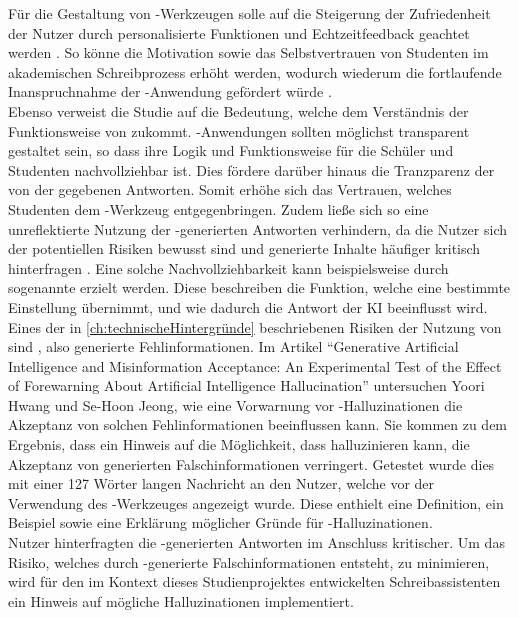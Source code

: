 \documentclass[../main.tex]{subfiles}
\begin{document}
Für die Gestaltung von -Werkzeugen solle auf die Steigerung der Zufriedenheit der Nutzer durch personalisierte Funktionen und Echtzeitfeedback geachtet 
werden \cite[10]{influencingUsingAi}. So könne die Motivation sowie das Selbstvertrauen von Studenten im akademischen Schreibprozess erhöht werden, wodurch 
wiederum die fortlaufende Inanspruchnahme der -Anwendung gefördert würde \cite[10]{influencingUsingAi}. \\Ebenso verweist die Studie auf die Bedeutung, welche dem 
Verständnis der Funktionsweise von  zukommt. -Anwendungen sollten möglichst transparent gestaltet sein, so dass ihre Logik und Funktionsweise für die Schüler und 
Studenten nachvollziehbar ist. Dies fördere darüber hinaus die Tranzparenz der von der  gegebenen Antworten. Somit erhöhe sich das Vertrauen, welches Studenten dem -Werkzeug 
entgegenbringen\cite[10]{influencingUsingAi}. Zudem ließe sich so eine unreflektierte Nutzung der -generierten Antworten verhindern, da die Nutzer sich der 
potentiellen Risiken bewusst sind und generierte Inhalte häufiger kritisch hinterfragen \cite[10]{influencingUsingAi}. Eine solche Nachvollziehbarkeit kann 
beispielsweise durch sogenannte  erzielt werden. Diese beschreiben die Funktion, welche eine bestimmte Einstellung übernimmt, und wie dadurch die Antwort der 
KI beeinflusst wird.\\  
Eines der in \autoref{ch:technischeHintergründe} beschriebenen Risiken der Nutzung von  sind , also generierte Fehlinformationen. Im Artikel "`Generative Artificial Intelligence 
and Misinformation Acceptance: An Experimental Test of the Effect of Forewarning About Artificial Intelligence Hallucination"' untersuchen Yoori Hwang und Se-Hoon Jeong, 
wie eine Vorwarnung vor -Halluzinationen die Akzeptanz von solchen Fehlinformationen beeinflussen kann. Sie kommen zu dem Ergebnis, dass ein Hinweis auf 
die Möglichkeit, dass  halluzinieren kann, die Akzeptanz von generierten Falschinformationen verringert. Getestet wurde dies mit einer 127 Wörter langen Nachricht an 
den Nutzer, welche vor der Verwendung des -Werkzeuges angezeigt wurde. Diese enthielt eine Definition, ein Beispiel sowie eine Erklärung möglicher Gründe für -Halluzinationen\cite[285]{hallucinationForewarning}. \\Nutzer hinterfragten die -generierten Antworten im Anschluss kritischer. Um das Risiko, welches durch -generierte Falschinformationen 
entsteht, zu minimieren, wird für den im Kontext dieses Studienprojektes entwickelten Schreibassistenten ein Hinweis auf mögliche Halluzinationen implementiert.\cite{hallucinationForewarning}

\end{document}
